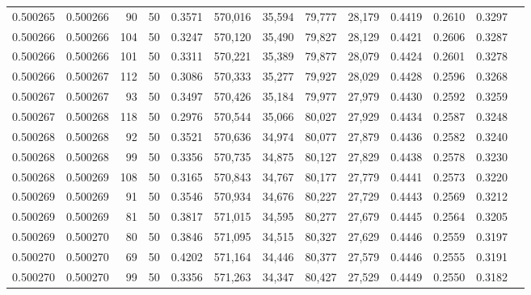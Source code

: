 \begin{tabular}{rrrrrrrrrrrrr}
0.500265 & 0.500266 &    90 &  50 &                                     0.3571 & 570,016 &  35,594 &  79,777 &  28,179 & 0.4419 & 0.2610 & 0.3297 \\
0.500266 & 0.500266 &   104 &  50 &                                     0.3247 & 570,120 &  35,490 &  79,827 &  28,129 & 0.4421 & 0.2606 & 0.3287 \\
0.500266 & 0.500266 &   101 &  50 &                                     0.3311 & 570,221 &  35,389 &  79,877 &  28,079 & 0.4424 & 0.2601 & 0.3278 \\
0.500266 & 0.500267 &   112 &  50 &                                     0.3086 & 570,333 &  35,277 &  79,927 &  28,029 & 0.4428 & 0.2596 & 0.3268 \\
0.500267 & 0.500267 &    93 &  50 &                                     0.3497 & 570,426 &  35,184 &  79,977 &  27,979 & 0.4430 & 0.2592 & 0.3259 \\
0.500267 & 0.500268 &   118 &  50 &                                     0.2976 & 570,544 &  35,066 &  80,027 &  27,929 & 0.4434 & 0.2587 & 0.3248 \\
0.500268 & 0.500268 &    92 &  50 &                                     0.3521 & 570,636 &  34,974 &  80,077 &  27,879 & 0.4436 & 0.2582 & 0.3240 \\
0.500268 & 0.500268 &    99 &  50 &                                     0.3356 & 570,735 &  34,875 &  80,127 &  27,829 & 0.4438 & 0.2578 & 0.3230 \\
0.500268 & 0.500269 &   108 &  50 &                                     0.3165 & 570,843 &  34,767 &  80,177 &  27,779 & 0.4441 & 0.2573 & 0.3220 \\
0.500269 & 0.500269 &    91 &  50 &                                     0.3546 & 570,934 &  34,676 &  80,227 &  27,729 & 0.4443 & 0.2569 & 0.3212 \\
0.500269 & 0.500269 &    81 &  50 &                                     0.3817 & 571,015 &  34,595 &  80,277 &  27,679 & 0.4445 & 0.2564 & 0.3205 \\
0.500269 & 0.500270 &    80 &  50 &                                     0.3846 & 571,095 &  34,515 &  80,327 &  27,629 & 0.4446 & 0.2559 & 0.3197 \\
0.500270 & 0.500270 &    69 &  50 &                                     0.4202 & 571,164 &  34,446 &  80,377 &  27,579 & 0.4446 & 0.2555 & 0.3191 \\
0.500270 & 0.500270 &    99 &  50 &                                     0.3356 & 571,263 &  34,347 &  80,427 &  27,529 & 0.4449 & 0.2550 & 0.3182 \\

\end{tabular}
